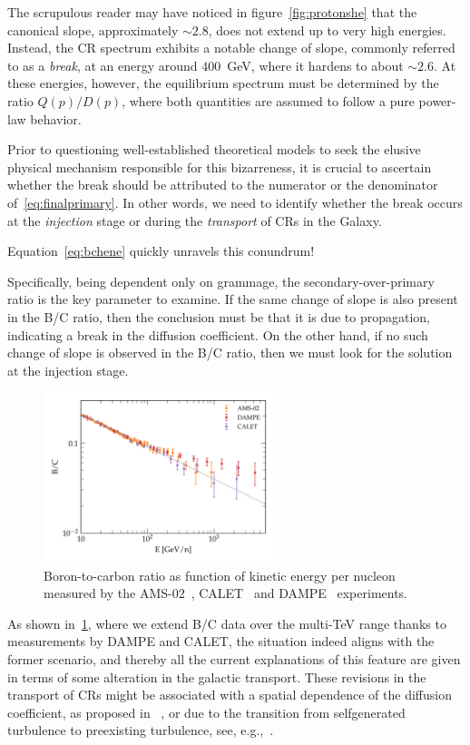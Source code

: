 The scrupulous reader may have noticed in figure~\ref{fig:protonshe} that the canonical slope, approximately $\sim 2.8$, does not extend up to very high energies. Instead, the CR spectrum exhibits a notable change of slope, commonly referred to as a \emph{break}, at an energy around $400$~GeV, where it hardens to about $\sim 2.6$.
%
At these energies, however, the equilibrium spectrum must be determined by the ratio $Q(p)/D(p)$, where both quantities are assumed to follow a pure power-law behavior. 

Prior to questioning well-established theoretical models to seek the elusive physical mechanism responsible for this bizarreness, it is crucial to ascertain whether the break should be attributed to the numerator or the denominator of~\cref{eq:finalprimary}. 
%
In other words, we need to identify whether the break occurs at the \emph{injection} stage or during the \emph{transport} of CRs in the Galaxy.

Equation~\eqref{eq:bchene} quickly unravels this conundrum! 

Specifically, being dependent only on grammage, the secondary-over-primary ratio is the key parameter to examine. 
%
If the same change of slope is also present in the B/C ratio, then the conclusion must be that it is due to propagation, indicating a break in the diffusion coefficient. On the other hand, if no such change of slope is observed in the B/C ratio, then we must look for the solution at the injection stage.

\begin{figure}
\centering
\includegraphics[width=0.6\textwidth]{figures/BC_highenergy.pdf}
\caption{Boron-to-carbon ratio as function of kinetic energy per nucleon measured by the AMS-02~\cite{AMS02results}, CALET~\cite{CALET.2022.BC} and DAMPE~\cite{DAMPE.2022.BC} experiments.}
\label{fig:bchighen}
\end{figure}

As shown in~\cref{fig:bchighen}, where we extend B/C data over the multi-TeV range thanks to measurements by DAMPE and CALET, the situation indeed aligns with the former scenario, and thereby all the current explanations of this feature are given in terms of some alteration in the galactic transport. 
%
These revisions in the transport of CRs might be associated with a spatial dependence of the diffusion coefficient, as proposed in ~\cite{Tomassetti2012apj}, or due to the transition from selfgenerated turbulence to preexisting turbulence, see, e.g.,~\cite{Evoli2018prl}.

